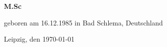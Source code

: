 \begin{titlepage}
\begin{addmargin}[-1cm]{-3cm}
\begin{center}
        \textbf{M.Sc \myName} \\\vfill
        
        geboren am 16.12.1985 in Bad Schlema, Deutschland \\\vfill
        
        Leipzig, den \today\vfill



        

        
%        
%
%

    \end{center}  
  \end{addmargin}       
\end{titlepage}   
